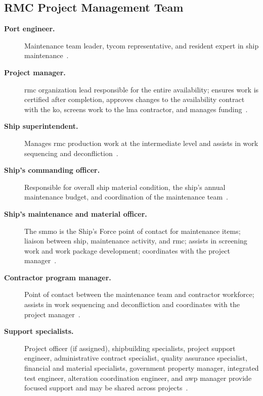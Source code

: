 \documentclass[../main.tex]{subfiles}
\begin{document}
\subsection{RMC Project Management Team}
\begin{description}
  \item[\textbf{Port engineer.}] Maintenance team leader, \ac{tycom} representative, and resident expert in ship maintenance~\autocite{edo-4-2-2-cno-availability-execution-2025}.
  \item[\textbf{Project manager.}] \ac{rmc} organization lead responsible for the entire availability; ensures work is certified after completion, approves changes to the availability contract with the \ac{ko}, screens work to the \ac{lma} contractor, and manages funding~\autocite{edo-4-2-2-cno-availability-execution-2025}.
  \item[\textbf{Ship superintendent.}] Manages \ac{rmc} production work at the intermediate level and assists in work sequencing and deconfliction~\autocite{edo-4-2-2-cno-availability-execution-2025}.
  \item[\textbf{Ship's commanding officer.}] Responsible for overall ship material condition, the ship's annual maintenance budget, and coordination of the maintenance team~\autocite{edo-4-2-2-cno-availability-execution-2025}.
  \item[\textbf{Ship's maintenance and material officer.}] The \ac{smmo} is the Ship's Force point of contact for maintenance items; liaison between ship, maintenance activity, and \ac{rmc}; assists in screening work and work package development; coordinates with the project manager~\autocite{edo-4-2-2-cno-availability-execution-2025}.
  \item[\textbf{Contractor program manager.}] Point of contact between the maintenance team and contractor workforce; assists in work sequencing and deconfliction and coordinates with the project manager~\autocite{edo-4-2-2-cno-availability-execution-2025}.
  \item[\textbf{Support specialists.}] Project officer (if assigned), shipbuilding specialists, project support engineer, administrative contract specialist, quality assurance specialist, financial and material specialists, government property manager, integrated test engineer, alteration coordination engineer, and \ac{awp} manager provide focused support and may be shared across projects~\autocite{edo-4-2-2-cno-availability-execution-2025}.
\end{description}
\end{document}
